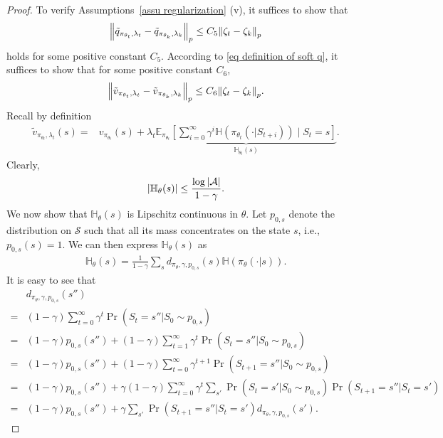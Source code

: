 \documentclass[twoside,11pt]{article}
\newcommand{\fS}{\mathcal{S}}
\newcommand{\fA}{\mathcal{A}}
\newcommand{\E}{\mathbb{E}}
\newcommand{\na}{{|\fA|}}
\newcommand{\ent}[1]{\mathbb{H}\left(#1\right)}
\numberwithin{assucounter}{section}
\begin{document}
\begin{proof}
  To verify Assumptions~\ref{assu regularization} (v), 
  it suffices to show that
  \begin{align}
    \norm{\tilde q_{\pi_{\theta_t}, \lambda_t} - \tilde q_{\pi_{\theta_k}, \lambda_k}}_p \leq C_5 \norm{\zeta_t - \zeta_k}_p
  \end{align}
  holds for some positive constant $C_5$.
  According to \eqref{eq definition of soft q},
  it suffices to show that for some positive constant $C_6$,
  \begin{align}
    \norm{\tilde v_{\pi_{\theta_t}, \lambda_t} - \tilde v_{\pi_{\theta_k}, \lambda_k}}_p \leq C_6 \norm{\zeta_t - \zeta_k}_p.
  \end{align}
  Recall by definition
  \begin{align}
    \label{eq tmp 12}
    \tilde v_{\pi_{\theta_t}, \lambda_t}(s) =& v_{\pi_{\theta_t}}(s) + \lambda_t \underbrace{\E_{\pi_{\theta_t}}\left[\sum_{i=0}^\infty \gamma^{i}  \ent{\pi_{\theta_t}(\cdot | S_{t+i})}   \mid S_t = s\right]}_{\mathbb{H}_{\theta_t}(s)}.
  \end{align}
  Clearly,
  \begin{align}
    \abs{\mathbb{H}_{\theta}(s)} \leq \frac{\log \na}{1 - \gamma}.
  \end{align}
  We now show that $\mathbb{H}_{\theta}(s)$ is Lipschitz continuous in $\theta$.
  Let $p_{0, s}$ denote the distribution on $\fS$ such that all its mass concentrates on the state $s$, i.e.,
  $p_{0, s}(s) = 1$.
  We can then express $\mathbb{H}_\theta(s)$ as
  \begin{align}
    \mathbb{H}_{\theta}(s) = \frac{1}{1-\gamma} \sum_{s} d_{\pi_\theta, \gamma, p_{0, s}}(s) \ent{\pi_\theta(\cdot |s)}.
  \end{align}
  It is easy to see that
  \begin{align}
    &d_{\pi_\theta, \gamma, p_{0, s}}(s'') \\
    =& (1 - \gamma) \sum_{t=0}^\infty \gamma^t \Pr(S_t=s'' | S_0 \sim p_{0, s}) \\
    =& (1 - \gamma) p_{0, s}(s'') + (1 - \gamma) \sum_{t=1}^{\infty} \gamma^t \Pr(S_t = s'' | S_0 \sim p_{0, s}) \\
    =& (1 - \gamma) p_{0, s}(s'') + (1 - \gamma) \sum_{t=0}^{\infty} \gamma^{t+1} \Pr(S_{t+1} = s'' | S_0 \sim p_{0, s}) \\
    =& (1 - \gamma) p_{0, s}(s'') + \gamma (1 - \gamma) \sum_{t=0}^{\infty} \gamma^t \sum_{s'} \Pr(S_t = s' | S_0 \sim p_{0, s}) \Pr(S_{t+1} = s'' | S_t = s') \\
    =& (1 - \gamma) p_{0, s}(s'') + \gamma \sum_{s'}\Pr(S_{t+1} = s'' | S_t = s') d_{\pi_\theta, \gamma, p_{0,s}}(s').

\end{align}
\end{proof}
\end{document}
